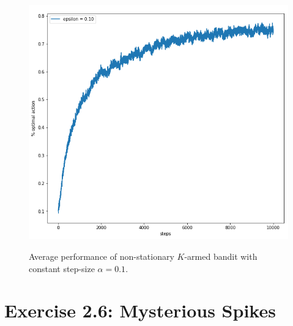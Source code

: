 \documentclass[a4paper,11pt]{article}
\numberwithin{equation}{section}
\theoremstyle{remark}
\begin{document}
\begin{figure}
	\centering
	\caption{Average performance of non-stationary $K$-armed bandit with constant step-size $\alpha=0.1$.}
	\includegraphics[scale=0.5]{ex2_5_2}
	\label{fig:KArmedBanditNonStationaryConstantStep}
\end{figure}


\section{Exercise 2.6: Mysterious Spikes}
\end{document}

